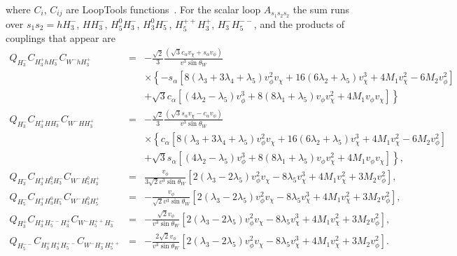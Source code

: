 \documentclass[11pt]{article}
\begin{document}
where $C_i$, $C_{ij}$ are LoopTools functions~\cite{Hahn:1998yk}.  For the scalar loop $A_{s_1s_2s_2}$ the sum runs over $s_1 s_2 = h H_3^-$, $H H_3^-$, $H_5^0 H_3^-$, $H_3^0 H_5^-$, $H_5^{++} H_3^+$, $H_3^- H_5^{--}$, and the products of couplings that appear are
\begin{eqnarray}
	Q_{H_3^-} C_{H_3^+ h H_3^-} C_{W^- h H_3^+} &=& - \frac{\sqrt{2}}{3}
	\frac{(\sqrt{3} c_{\alpha} v_{\chi} + s_{\alpha} v_{\phi})}{v^3 \sin\theta_W} \nonumber\\
	&& \times \left\{ - s_{\alpha} \left[ 8 (\lambda_3 + 3 \lambda_4 + \lambda_5) v_{\phi}^2 v_{\chi} + 16 (6 \lambda_2 + \lambda_5) v_{\chi}^3 + 4 M_1 v_{\chi}^2 - 6 M_2 v_{\phi}^2 \right] \right. \nonumber \\
	&& \left. + \sqrt{3} c_{\alpha} \left[ (4 \lambda_2 - \lambda_5) v_{\phi}^3 + 
		8 (8 \lambda_1 + \lambda_5) v_{\phi} v_{\chi}^2 + 4 M_1 v_{\phi} v_{\chi} \right] 
	\right\} \\
%
	Q_{H_3^-} C_{H_3^+ H H_3^-} C_{W^- H H_3^+} &=& - \frac{\sqrt{2}}{3} 
	\frac{(\sqrt{3} s_{\alpha} v_{\chi} - c_{\alpha} v_{\phi})}{v^3 \sin\theta_W} \nonumber \\
	&& \times \left\{ c_{\alpha} \left[ 8 (\lambda_3 + 3 \lambda_4 + \lambda_5) v_{\phi}^2 v_{\chi} + 16 (6 \lambda_2 + \lambda_5) v_{\chi}^3 + 4 M_1 v_{\chi}^2 - 6 M_2 v_{\phi}^2 \right] \right. \nonumber \\
	&& \left. + \sqrt{3} s_{\alpha} \left[ (4 \lambda_2 - \lambda_5) v_{\phi}^3 + 
		8 (8 \lambda_1 + \lambda_5) v_{\phi} v_{\chi}^2 + 4 M_1 v_{\phi} v_{\chi} \right] 
	\right\}, \\
%
	Q_{H_3^-} C_{H_3^+ H_5^0 H_3^-} C_{W^- H_5^0 H_3^+} &=& \frac{v_{\phi}}{3 \sqrt{2} v^3 \sin\theta_W} \left[ 2(\lambda_3 - 2 \lambda_5) v_{\phi}^2 v_{\chi} - 8 \lambda_5 v_{\chi}^3 + 4 M_1 v_{\chi}^2 + 3 M_2 v_{\phi}^2 \right], \\
%
	Q_{H_5^-} C_{H_3^+ H_3^0 H_5^-} C_{W^- H_3^0 H_5^+} &=& -\frac{v_{\phi}}{\sqrt{2} v^3 \sin\theta_W} \left[ 2(\lambda_3 - 2 \lambda_5) v_{\phi}^2 v_{\chi} - 8 \lambda_5 v_{\chi}^3 + 4 M_1 v_{\chi}^2 + 3 M_2 v_{\phi}^2 \right], \\
%
	Q_{H_3^+} C_{H_3^+ H_5^{--} H_3^+} C_{W^- H_5^{++} H_3^-} &=& - \frac{\sqrt{2} v_{\phi}}{v^3 \sin\theta_W} \left[ 2(\lambda_3 - 2 \lambda_5) v_{\phi}^2 v_{\chi} - 8 \lambda_5 v_{\chi}^3 + 4 M_1 v_{\chi}^2 + 3 M_2 v_{\phi}^2 \right], \\
%
	Q_{H_5^{--}} C_{H_3^+ H_3^+ H_5^{--}} C_{W^- H_3^- H_5^{++}} &=& - \frac{2 \sqrt{2} v_{\phi}}{v^3 \sin\theta_W} \left[ 2(\lambda_3 - 2 \lambda_5) v_{\phi}^2 v_{\chi} - 8 \lambda_5 v_{\chi}^3 + 4 M_1 v_{\chi}^2 + 3 M_2 v_{\phi}^2 \right].
\end{eqnarray}
\end{document}
